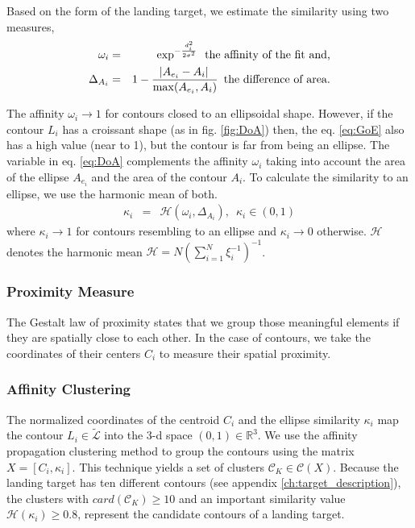 Based on the form of the landing target, we estimate the similarity using two measures, 
\begin{eqnarray}
\omega_{i}&=&\exp^{-\frac{d_{i}^{2}}{2\sigma^{2}}}\enspace \mbox{the affinity of the fit and,}\label{eq:GoE}\\
\Delta_{A_{i}}&=& 1-\frac{\abs{ A_{e_{i}}-A_{i}}}{\max(A_{e_{i}},A_{i})} \enspace \mbox{the difference of area.}\label{eq:DoA}
\end{eqnarray}

The affinity $\omega_{i}\rightarrow 1$ for contours closed to an ellipsoidal shape. However, if the contour $L_{i}$ has a croissant shape (as in fig. \ref{fig:DoA}) then, the eq. \eqref{eq:GoE} also has a high value (near to 1), but the contour is far from being an ellipse. The variable in eq. \eqref{eq:DoA} complements the affinity $\omega_{i}$ taking into account the area of the ellipse $A_{e_{i}}$ and the area of the contour $A_{i}$. To calculate the similarity to an ellipse, we use the harmonic mean of both. 
\begin{eqnarray}
\kappa_{i}&=&\mathcal{H}(\omega_{i}, \Delta_{A_{i}}), \enspace \kappa_{i}\in (0,1)\label{eq:similarity}
\end{eqnarray}
where $\kappa_{i}\rightarrow 1$ for contours resembling to an ellipse and $\kappa_{i}\rightarrow 0$ otherwise. $\mathcal{H}$ denotes the harmonic mean $\mathcal{H}= N \left(\sum\limits_{i=1}^{N} \xi_{i}^{-1} \right)^{-1}$.

\subsubsection{Proximity Measure}\label{subsec:proximity}
The Gestalt law of proximity states that we group those meaningful elements if they are spatially close to each other. In the case of contours, we take the coordinates of their centers $C_{i}$ to measure their spatial proximity.

\subsubsection{Affinity Clustering}\label{subsec:clustering}
The normalized coordinates of the centroid $C_i$ and the ellipse similarity $\kappa_i$ map the contour $L_i\in \widetilde{\mathcal{L}}$ into the 3-d space $(0,1) \in \mathbb{R}^3$. We use the affinity propagation clustering method \citep{Frey.Dueck:SCIENCE:2017} to group the contours using the matrix $X=[C_{i}, \kappa_{i}]$. This technique yields a set of clusters $\mathcal{C}_{K}\in \mathcal{C}(X)$. Because the landing target has ten different contours (see appendix \ref{ch:target_description}), the clusters with $card(\mathcal{C}_{K})\geq 10$ and an important similarity value $\mathcal{H}(\kappa_{i})\geq 0.8$, represent the candidate contours of a landing target.


